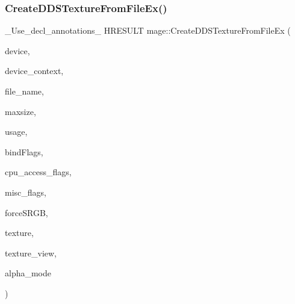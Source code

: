 \subsubsection{\texorpdfstring{Create\+D\+D\+S\+Texture\+From\+File\+Ex()}{CreateDDSTextureFromFileEx()}\hspace{0.1cm}{\footnotesize\ttfamily [4/4]}}
{\footnotesize\ttfamily \+\_\+\+Use\+\_\+decl\+\_\+annotations\+\_\+ H\+R\+E\+S\+U\+LT mage\+::\+Create\+D\+D\+S\+Texture\+From\+File\+Ex (\begin{DoxyParamCaption}\item[{I\+D3\+D11\+Device2 $\ast$}]{device,  }\item[{I\+D3\+D11\+Device\+Context $\ast$}]{device\+\_\+context,  }\item[{const wchar\+\_\+t $\ast$}]{file\+\_\+name,  }\item[{size\+\_\+t}]{maxsize,  }\item[{D3\+D11\+\_\+\+U\+S\+A\+GE}]{usage,  }\item[{uint32\+\_\+t}]{bind\+Flags,  }\item[{uint32\+\_\+t}]{cpu\+\_\+access\+\_\+flags,  }\item[{uint32\+\_\+t}]{misc\+\_\+flags,  }\item[{bool}]{force\+S\+R\+GB,  }\item[{I\+D3\+D11\+Resource $\ast$$\ast$}]{texture,  }\item[{I\+D3\+D11\+Shader\+Resource\+View $\ast$$\ast$}]{texture\+\_\+view,  }\item[{\hyperlink{namespacemage_a0c586a2bad862f4858900ca121ca80c2}{D\+D\+S\+\_\+\+A\+L\+P\+H\+A\+\_\+\+M\+O\+DE} $\ast$}]{alpha\+\_\+mode }\end{DoxyParamCaption})}

\hypertarget{namespacemage_ae694dfc6b3a2c61338a346041f223306}{}\label{namespacemage_ae694dfc6b3a2c61338a346041f223306} 
